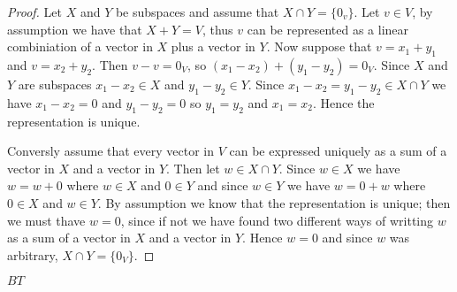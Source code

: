 



    \maketitle 

    \question 

    \begin{proof}
        Let $X$ and $Y$ be subspaces and assume that $X \cap Y = \{0_v\}$. Let $v \in V$, by assumption we have that $X + Y = V$, thus $v$ can be represented as a linear combiniation 
        of a vector in $X$ plus a vector in $Y$. Now suppose that $v = x_1 + y_1 $ and $v = x_2 + y_2$. Then $v - v = 0_V$, so $(x_1 - x_2) + (y_1 - y_2) = 0_V$. Since 
        $X$ and $Y$ are subspaces $x_1 - x_2 \in X$ and $y_1- y_2 \in Y$. Since $x_1 - x_2 = y_1 - y_2 \in X \cap Y$ we have $x_1 - x_2 = 0$ and $y_1 - y_2 = 0$ so $y_1 = y_2$ and $x_1 = x_2$. 
        Hence the representation is unique. 

        Conversly assume that every vector in $V$ can be expressed uniquely as a sum of a vector in $X$ and a vector in $Y$. Then let $w \in X \cap Y$. Since $w \in X$ we have $w = w + 0$ where $w \in X$ and $0 \in Y$ and since $w \in Y$ we have 
        $w = 0 + w$ where $0 \in X$ and $w \in Y$. By assumption we know that the representation is unique; then we must thave $w = 0$, since if not we have found two different ways of writting $w$ as a sum of a vector in $X$ and a vector in $Y$. 
        Hence $w = 0$ and since $w$ was arbitrary, $X \cap Y = \{0_V\}$.
    \end{proof}

    \newpage 
    \question 
    $BT$ 

